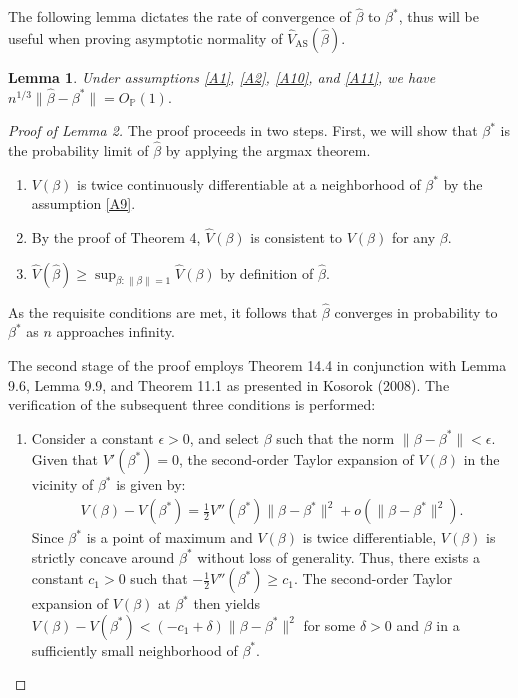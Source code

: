 \documentclass{article}
\newcommand{\wh}{\widehat}
\newcommand{\pr}{\mathbb{P}}
\newtheorem{lemma}{Lemma}
\begin{document}
The following lemma dictates the rate of convergence of $\hat\beta$ to $\beta^*$, thus will be useful when proving asymptotic normality of $\wh V_\text{AS}(\hat\beta)$. 
%
\begin{lemma} \label{lemma:2}
		Under assumptions \ref{A1}, \ref{A2}, \ref{A10}, and \ref{A11},
		we have
		$n^{1/3} \|\hat\beta - \beta^*\| = O_{\pr}(1).$
	\end{lemma}
\begin{proof}[Proof of Lemma 2] 
The proof proceeds in two steps. First, we will show that $\beta^*$ is the probability limit of $\hat\beta$ by applying the argmax theorem.
	\begin{enumerate}
		\item[(i)] $V(\beta)$ is twice continuously differentiable at a neighborhood of $\beta^*$ by the assumption \ref{A9}.
		\item[(ii)] By the proof of Theorem 4, $\wh V(\beta)$ is consistent to $V(\beta)$ for any $\beta$.
		\item[(iii)] $\wh V(\hat\beta) \ge \sup_{\beta: \|\beta\|=1} \wh V(\beta)$ by definition of $\hat\beta$.
	\end{enumerate}
	As the requisite conditions are met, it follows that $\hat\beta$ converges in probability to $\beta^*$ as $n$ approaches infinity.
		
	The second stage of the proof employs Theorem 14.4 in conjunction with Lemma 9.6, Lemma 9.9, and Theorem 11.1 as presented in Kosorok (2008). The verification of the subsequent three conditions is performed:
	\begin{enumerate}
		\item[(i)] Consider a constant $\epsilon > 0$, and select $\beta$ such that the norm $\|\beta - \beta^*\| < \epsilon$. Given that $V'(\beta^*) = 0$, the second-order Taylor expansion of $V(\beta)$ in the vicinity of $\beta^*$ is given by:
		\begin{align*}
			V(\beta) - V(\beta^*) = \frac12 V''(\beta^*)\|\beta - \beta^*\|^2 + o(\|\beta - \beta^*\|^2).
		\end{align*}
	Since $\beta^*$ is a point of maximum and $V(\beta)$ is twice differentiable, $V(\beta)$ is strictly concave around $\beta^*$ without loss of generality. Thus, there exists a constant $c_1 > 0$ such that $-\frac12 V''(\beta^*) \ge c_1$. The second-order Taylor expansion of $V(\beta)$ at $\beta^*$ then yields $V(\beta) - V(\beta^*) < (-c_1 + \delta) \|\beta - \beta^*\|^2$ for some $\delta > 0$ and $\beta$ in a sufficiently small neighborhood of $\beta^*$.
		

\end{enumerate}
\end{proof}
\end{document}
